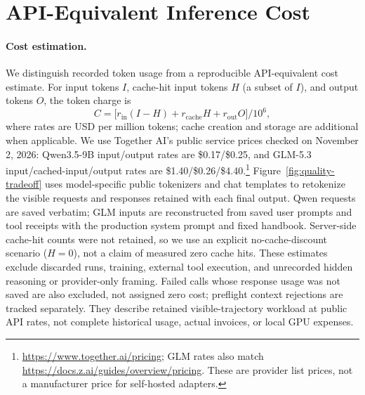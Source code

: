 \section{API-Equivalent Inference Cost}
\paragraph{Cost estimation.}\label{sec:inference-cost}
We distinguish recorded token usage from a reproducible API-equivalent cost estimate. For input tokens $I$, cache-hit input tokens $H$ (a subset of $I$), and output tokens $O$, the token charge is
\begin{equation}
 C=\bigl[r_{\mathrm{in}}(I-H)+r_{\mathrm{cache}}H+r_{\mathrm{out}}O\bigr]/10^6,
\end{equation}
where rates are USD per million tokens; cache creation and storage are additional when applicable. We use Together AI's public service prices checked on November 2, 2026: Qwen3.5-9B input/output rates are \$0.17/\$0.25, and GLM-5.3 input/cached-input/output rates are \$1.40/\$0.26/\$4.40.\footnote{\url{https://www.together.ai/pricing}; GLM rates also match \url{https://docs.z.ai/guides/overview/pricing}. These are provider list prices, not a manufacturer price for self-hosted adapters.}
Figure~\ref{fig:quality-tradeoff} uses model-specific public tokenizers and chat templates to retokenize the visible requests and responses retained with each final output. Qwen requests are saved verbatim; GLM inputs are reconstructed from saved user prompts and tool receipts with the production system prompt and fixed handbook. Server-side cache-hit counts were not retained, so we use an explicit no-cache-discount scenario ($H=0$), not a claim of measured zero cache hits. These estimates exclude discarded runs, training, external tool execution, and unrecorded hidden reasoning or provider-only framing. Failed calls whose response usage was not saved are also excluded, not assigned zero cost; preflight context rejections are tracked separately. They describe retained visible-trajectory workload at public API rates, not complete historical usage, actual invoices, or local GPU expenses.

\begin{table}[htbp]
\centering\footnotesize
\setlength{\tabcolsep}{3pt}

\caption{Estimated API-equivalent USD per 100 attempted work units, using the same visible-trajectory scope and no-cache-discount scenario in both datasets. Direct's traditional cost includes its two invalid responses and excludes skipped suffixes from the attempt denominator. These are retokenized estimates at public service rates, not historical invoices or self-hosting expenses. See Section~\ref{sec:inference-cost} for the accounting definition.}
\label{tab:api-equivalent-cost}
\end{table}


